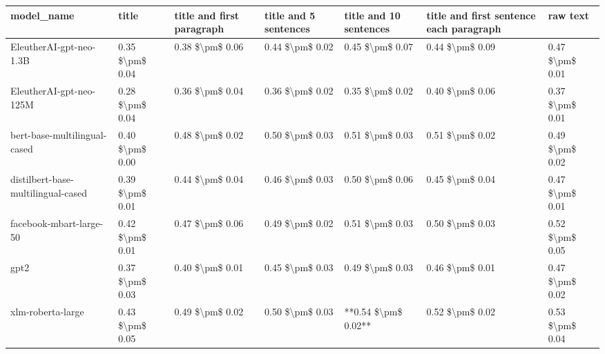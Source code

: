 \begin{tabular}{lllllll}
\toprule
                        model\_name &           title & title and first paragraph & title and 5 sentences & title and 10 sentences & title and first sentence each paragraph &        raw text \\
\midrule
           EleutherAI-gpt-neo-1.3B & 0.35 \$\textbackslash pm\$ 0.04 &           0.38 \$\textbackslash pm\$ 0.06 &       0.44 \$\textbackslash pm\$ 0.02 &        0.45 \$\textbackslash pm\$ 0.07 &                         0.44 \$\textbackslash pm\$ 0.09 & 0.47 \$\textbackslash pm\$ 0.01 \\
           EleutherAI-gpt-neo-125M & 0.28 \$\textbackslash pm\$ 0.04 &           0.36 \$\textbackslash pm\$ 0.04 &       0.36 \$\textbackslash pm\$ 0.02 &        0.35 \$\textbackslash pm\$ 0.02 &                         0.40 \$\textbackslash pm\$ 0.06 & 0.37 \$\textbackslash pm\$ 0.01 \\
      bert-base-multilingual-cased & 0.40 \$\textbackslash pm\$ 0.00 &           0.48 \$\textbackslash pm\$ 0.02 &       0.50 \$\textbackslash pm\$ 0.03 &        0.51 \$\textbackslash pm\$ 0.03 &                         0.51 \$\textbackslash pm\$ 0.02 & 0.49 \$\textbackslash pm\$ 0.02 \\
distilbert-base-multilingual-cased & 0.39 \$\textbackslash pm\$ 0.01 &           0.44 \$\textbackslash pm\$ 0.04 &       0.46 \$\textbackslash pm\$ 0.03 &        0.50 \$\textbackslash pm\$ 0.06 &                         0.45 \$\textbackslash pm\$ 0.04 & 0.47 \$\textbackslash pm\$ 0.01 \\
           facebook-mbart-large-50 & 0.42 \$\textbackslash pm\$ 0.01 &           0.47 \$\textbackslash pm\$ 0.06 &       0.49 \$\textbackslash pm\$ 0.02 &        0.51 \$\textbackslash pm\$ 0.03 &                         0.50 \$\textbackslash pm\$ 0.03 & 0.52 \$\textbackslash pm\$ 0.05 \\
                              gpt2 & 0.37 \$\textbackslash pm\$ 0.03 &           0.40 \$\textbackslash pm\$ 0.01 &       0.45 \$\textbackslash pm\$ 0.03 &        0.49 \$\textbackslash pm\$ 0.03 &                         0.46 \$\textbackslash pm\$ 0.01 & 0.47 \$\textbackslash pm\$ 0.02 \\
                 xlm-roberta-large & 0.43 \$\textbackslash pm\$ 0.05 &           0.49 \$\textbackslash pm\$ 0.02 &       0.50 \$\textbackslash pm\$ 0.03 &    **0.54 \$\textbackslash pm\$ 0.02** &                         0.52 \$\textbackslash pm\$ 0.02 & 0.53 \$\textbackslash pm\$ 0.04 \\
\bottomrule
\end{tabular}
